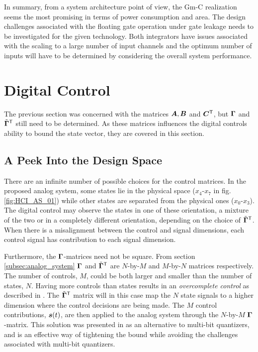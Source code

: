 In summary, from a system architecture point of view, the Gm-C realization seems the most promising in terms of power consumption and area. The design challenges associated with the floating gate operation under gate leakage needs to be investigated for the given technology. Both integrators have issues associated with the scaling to a large number of input channels and the optimum number of inputs will have to be determined by considering the overall system performance.

















\section{Digital Control}
The previous section was concerned with the matrices $\bm{A}, \bm{B}$ and $\bm{C}^\mathsf{T}$, but $\bm{\Gamma}$ and $\tilde{\bm{\Gamma}}^\mathsf{T}$ still need to be determined. As these matrices influences the digital controls ability to bound the state vector, they are covered in this section.

\subsection{A Peek Into the Design Space}
\label{sec:advanced_DC}
There are an infinite number of possible choices for the control matrices. In the proposed analog system, some states lie in the physical space ($x_4$-$x_7$ in fig. \ref{fig:HCI_AS_01}) while other states are separated from the physical ones ($x_0$-$x_3$). The digital control may observe the states in one of these orientation, a mixture of the two or in a completely different orientation, depending on the choice of $\tilde{\bm{\Gamma}}^\mathsf{T}$. When there is a misalignment between the control and signal dimensions, each control signal has contribution to each signal dimension.

Furthermore, the $\bm{\Gamma}$-matrices need not be square. From section \ref{subsec:analog_system} $\bm{\Gamma}$ and $\tilde{\bm{\Gamma}}^\mathsf{T}$ are $N$-by-$M$ and $M$-by-$N$ matrices respectively. The number of controls, $M$, could be both larger and smaller than the number of states, $N$. Having more controls than states results in an \textit{overcomplete control} as described in \cite{malmberg_thesis}. The $\tilde{\bm{\Gamma}}^\mathsf{T}$ matrix will in this case map the $N$ state signals to a higher dimension where the control decisions are being made. The $M$ control contributions, $\bm{s}(t)$, are then applied to the analog system through the $N$-by-$M$ $\bm{\Gamma}$-matrix. This solution was presented in \cite{malmberg_thesis} as an alternative to multi-bit quantizers, and is an effective way of tightening the bound while avoiding the challenges associated with multi-bit quantizers.

